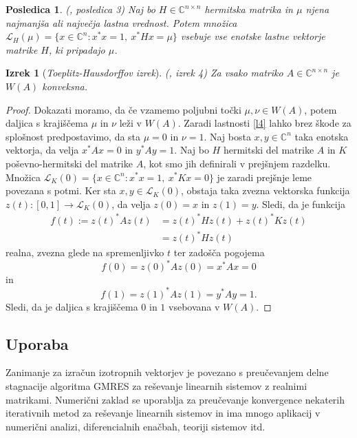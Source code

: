 \documentclass[12pt,a4paper]{amsart}
\theoremstyle{definition}
\theoremstyle{plain}
\newtheorem{izrek}[definicija]{Izrek}
\newtheorem{posledica}[definicija]{Posledica}
\newcommand{\LH}{\mathcal{L}}
\newcommand{\C}{\mathbb C}
\begin{document}
\begin{posledica}(\cite{zaloga}, posledica 3)
Naj bo $H\in \C^{n\times n}$ hermitska matrika in $\mu$ njena najmanjša ali največja lastna vrednost. Potem množica $\LH_{H}(\mu)=\{x\in \C^n\! : x^\ast x=1,\ x^\ast Hx=\mu \}$ vsebuje vse enotske lastne vektorje matrike $H$, ki pripadajo $\mu$.
\end{posledica}

\begin{izrek}[\emph{Toeplitz-Hausdorffov izrek}](\cite{zaloga}, izrek 4)
Za vsako matriko $A\in \C^{n\times n}$ je $W(A)$ konveksna.
\end{izrek}

\begin{proof}
Dokazati moramo, da če vzamemo poljubni točki $\mu, \nu \in W(A)$, potem daljica s krajiščema $\mu$ in $\nu$ leži v $W(A)$. Zaradi lastnosti \ref{l4} lahko brez škode za splošnost predpostavimo, da sta $\mu=0$ in $\nu=1$. Naj bosta $x,y\in \C^n$ taka enotska vektorja, da velja $x^\ast Ax=0$ in $y^\ast Ay=1$. 
Naj bo $H$ hermitski del matrike $A$ in $K$ poševno-hermitski del matrike $A$, kot smo jih definirali v prejšnjem razdelku. Množica $\LH_{K}(0) =\{x\in \C^n\! : x^\ast x=1,\ x^\ast Kx=0\}$ je zaradi prejšnje leme povezana s potmi. Ker sta $x,y\in \LH_{K}(0)$, obstaja taka zvezna vektorska funkcija $z(t): [0,1] \rightarrow \LH_{K}(0)$, da velja $z(0)=x$ in $z(1)=y$.  Sledi, da je funkcija 
\begin{align*}
f(t):= z(t)^\ast A z(t) &= z(t)^\ast Hz(t) +z(t)^\ast K z(t) \\
 &= z(t)^\ast Hz(t)
\end{align*}
realna, zvezna glede na spremenljivko $t$ ter zadošča pogojema $$f(0)= z(0)^\ast Az(0)=x^\ast Ax=0$$ in $$f(1)= z(1)^\ast Az(1)=y^\ast Ay=1.$$ Sledi, da je daljica s krajiščema $0$ in $1$ vsebovana v $W(A)$.
\end{proof}

\subsection{Uporaba}
Zanimanje za izračun izotropnih vektorjev je povezano s pre\-u\-če\-va\-njem delne stagnacije algoritma GMRES za reševanje linearnih sistemov z realnimi matrikami. Numerični zaklad se uporablja za preučevanje konvergence nekaterih iterativnih metod za reševanje linearnih sistemov in ima mnogo aplikacij v numerični analizi, diferencialnih enačbah, teoriji sistemov itd.
\end{document}
